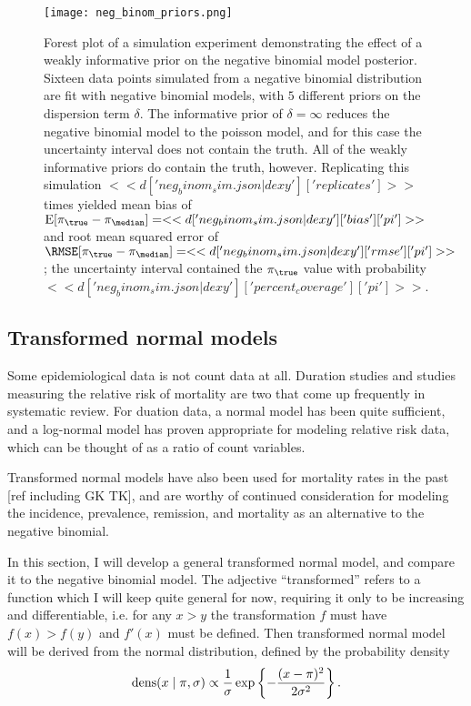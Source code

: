 \begin{figure}
\begin{center}
\texttt{[image: neg\_binom\_priors.png]}
\end{center}
\caption{Forest plot of a simulation experiment demonstrating the
  effect of a weakly informative prior on the negative binomial model
  posterior.  Sixteen data points simulated from a negative binomial
  distribution are fit with negative binomial models, with $5$
  different priors on the dispersion term $\delta$.  The informative
  prior of $\delta = \infty$ reduces the negative binomial model to
  the poisson model, and for this case the uncertainty interval does
  not contain the truth.  All of the weakly informative priors do
  contain the truth, however.  Replicating this simulation
  $<<d['neg_binom_sim.json|dexy']['replicates']>>$ times yielded mean
  bias of
  $\E[\pi_{\true}-\pi_{\median}]=<<d['neg_binom_sim.json|dexy']['bias']['pi']>>$
  and root mean squared error of
  $\RMSE[\pi_{\true}-\pi_{\median}]=<<d['neg_binom_sim.json|dexy']['rmse']['pi']>>$;
  the uncertainty interval contained the $\pi_{\true}$ value with probability
  $<<d['neg_binom_sim.json|dexy']['percent_coverage']['pi']>>$.}
\label{fig:theory-rate_model-neg_binom_priors}
\end{figure}

\subsection{Transformed normal models}
Some epidemiological data is not count data at all.  Duration studies
and studies measuring the relative risk of mortality are two that come
up frequently in systematic review.  For duation data, a normal model
has been quite sufficient, and a log-normal model has proven
appropriate for modeling relative risk data, which can be thought of
as a ratio of count variables.

Transformed normal models have also been used for mortality rates in
the past [ref including GK TK], and are worthy of continued consideration for
modeling the incidence, prevalence, remission, and mortality as an
alternative to the negative binomial.

In this section, I will develop a general transformed normal model,
and compare it to the negative binomial model.  The adjective
``transformed'' refers to a function which I will keep quite general
for now, requiring it only to be increasing and differentiable,
i.e. for any $x > y$ the transformation $f$ must have $f(x) > f(y)$
and $f'(x)$ must be defined.  Then transformed normal model will be
derived from the normal distribution, defined by the probability
density
\[
\operatorname{dens}(x\;|\; \pi, \sigma) \propto \frac{1}{\sigma} \exp\left\{ -\frac{(x-\pi)^2}{2\sigma^2} \right\}.
\]

